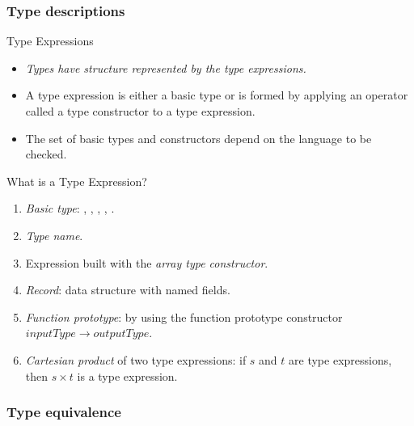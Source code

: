 \begin{bibunit}[apalike]
\subsubsection{Type descriptions}

\tableofcontentslide[sections={3-6},sectionstyle={show/shaded},subsectionstyle={show/shaded/hide},subsubsectionstyle={show/shaded/hide/hide}]

\begin{frame}{Type Expressions}
	\begin{itemize}
	\item \emph{Types have structure represented by the type expressions.}
	\vfill
	\item A type expression is either a basic type or is formed by applying an operator called a type constructor to a type expression.
	\vfill
	\item The set of basic types and constructors depend on the language to be checked.
	\end{itemize}
\end{frame}

\begin{frame}{What is a Type Expression?}
	\begin{enumerate}
	\item \emph{Basic type}: , , , , .
	\item \emph{Type name}.
	\item Expression built with the \emph{array type constructor}.
	\item \emph{Record}: data structure with named fields.
	\item \emph{Function prototype}: by using the function prototype constructor $inputType \rightarrow outputType$.
	\item \emph{Cartesian product} of two type expressions: if $s$ and $t$ are type expressions, then $s \times t$ is a type expression.
	\end{enumerate}
\end{frame}

\subsubsection{Type equivalence}

\tableofcontentslide[sections={3-6},sectionstyle={show/shaded},subsectionstyle={show/shaded/hide},subsubsectionstyle={show/shaded/hide/hide}]


\end{bibunit}
